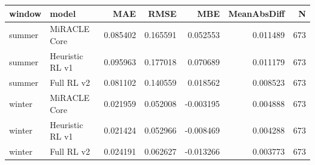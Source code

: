 \begin{tabular}{llrrrrr}
\toprule
window & model & MAE & RMSE & MBE & MeanAbsDiff & N \\
\midrule
summer & MiRACLE Core & 0.085402 & 0.165591 & 0.052553 & 0.011489 & 673 \\
summer & Heuristic RL v1 & 0.095963 & 0.177018 & 0.070689 & 0.011179 & 673 \\
summer & Full RL v2 & 0.081102 & 0.140559 & 0.018562 & 0.008523 & 673 \\
winter & MiRACLE Core & 0.021959 & 0.052008 & -0.003195 & 0.004888 & 673 \\
winter & Heuristic RL v1 & 0.021424 & 0.052966 & -0.008469 & 0.004288 & 673 \\
winter & Full RL v2 & 0.024191 & 0.062627 & -0.013266 & 0.003773 & 673 \\
\bottomrule
\end{tabular}
